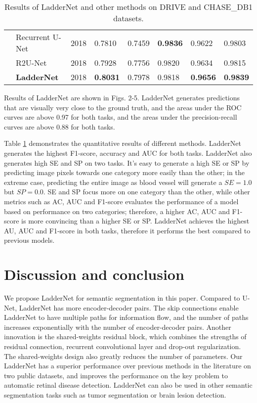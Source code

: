 \documentclass{article}
\begin{document}
\begin{table}[]
{\begin{tabular}{@{}|l|l|l|l|l|l|l|l|@{}}
                             & Recurrent U-Net  \cite{alom2018recurrent}  & 2018 & 0.7810          & 0.7459          & \textbf{0.9836} & 0.9622          & 0.9803          \\ \cmidrule(l){2-8} 
                             & R2U-Net   \cite{alom2018recurrent}         & 2018 & 0.7928          & 0.7756          & 0.9820          & 0.9634          & 0.9815          \\ \cmidrule(l){2-8} 
                             & \textbf{LadderNet}          & 2018 & \textbf{0.8031} & 0.7978          & 0.9818          & \textbf{0.9656} & \textbf{0.9839} \\ \bottomrule
\end{tabular}}

\caption{Results of LadderNet and other methods on DRIVE and CHASE\_DB1 datasets.}
\label{Table}
\end{table}

Results of LadderNet are shown in Figs. 2-5. LadderNet generates predictions that are visually very close to the ground truth, and the areas under the ROC curves are above 0.97 for both tasks, and the areas under the precision-recall curves are above 0.88 for both tasks.
\par
Table \ref{Table} demonstrates the quantitative results of different methods. LadderNet generates the highest F1-score, accuracy and AUC for both tasks. LadderNet also generates high SE and SP on two tasks. It's easy to generate a high SE or SP by predicting image pixels towards one category more easily than the other; in the extreme case, predicting the entire image as blood vessel will generate a $SE=1.0$ but $SP=0.0$. SE and SP focus more on one category than the other, while other metrics such as AC, AUC and F1-score evaluates the performance of a model based on performance on two categories; therefore, a higher AC, AUC and F1-score is more convincing than a higher SE or SP. LadderNet achieves the highest AU, AUC and F1-score in both tasks, therefore it performs the best compared to previous models.

\section{Discussion and conclusion}
We propose LadderNet for semantic segmentation in this paper. Compared to U-Net, LadderNet has more encoder-decoder pairs. The skip connections enable LadderNet to have multiple paths for information flow, and the number of paths increases exponentially with the number of encoder-decoder pairs. Another innovation is the shared-weights residual block, which combines the strengths of residual connection, recurrent convolutional layer and drop-out regularization. The shared-weights design also greatly reduces the number of parameters. Our LadderNet has a superior performance over previous methods in the literature on two public datasets, and improves the performance on the key problem to automatic retinal disease detection. LadderNet can also be used in other semantic segmentation tasks such as tumor segmentation or brain lesion detection.

\small{

}
\end{document}
